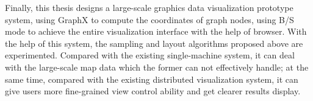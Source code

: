 Finally, this thesis designs a large-scale graphics data visualization prototype system, using GraphX to compute the coordinates of graph nodes, using B/S mode to achieve the entire visualization interface with the help of browser. With the help of this system, the sampling and layout algorithms proposed above are experimented. Compared with the existing single-machine system, it can deal with the large-scale map data which the former can not effectively handle; at the same time, compared with the existing distributed visualization system, it can give users more fine-grained view control ability and get clearer results display.

